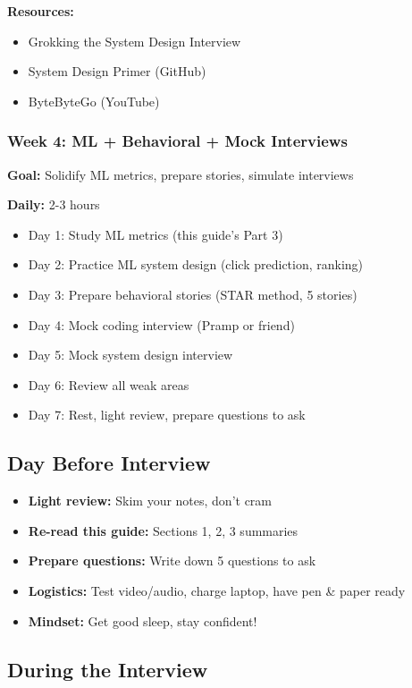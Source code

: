 \documentclass[11pt,letterpaper]{article}
\begin{document}
\textbf{Resources:}
\begin{itemize}
    \item Grokking the System Design Interview
    \item System Design Primer (GitHub)
    \item ByteByteGo (YouTube)
\end{itemize}

\subsubsection{Week 4: ML + Behavioral + Mock Interviews}

\textbf{Goal:} Solidify ML metrics, prepare stories, simulate interviews

\textbf{Daily:} 2-3 hours
\begin{itemize}
    \item Day 1: Study ML metrics (this guide's Part 3)
    \item Day 2: Practice ML system design (click prediction, ranking)
    \item Day 3: Prepare behavioral stories (STAR method, 5 stories)
    \item Day 4: Mock coding interview (Pramp or friend)
    \item Day 5: Mock system design interview
    \item Day 6: Review all weak areas
    \item Day 7: Rest, light review, prepare questions to ask
\end{itemize}

\subsection{Day Before Interview}

\begin{itemize}
    \item \textbf{Light review:} Skim your notes, don't cram
    \item \textbf{Re-read this guide:} Sections 1, 2, 3 summaries
    \item \textbf{Prepare questions:} Write down 5 questions to ask
    \item \textbf{Logistics:} Test video/audio, charge laptop, have pen \& paper ready
    \item \textbf{Mindset:} Get good sleep, stay confident!
\end{itemize}

\subsection{During the Interview}
\end{document}
